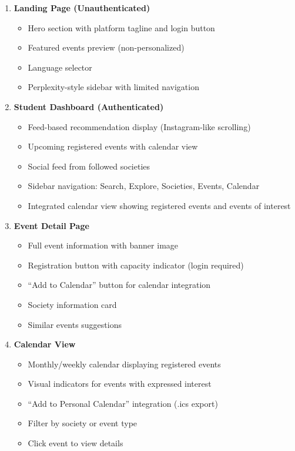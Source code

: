 \documentclass[12pt,a4paper]{article}
\begin{document}
\begin{enumerate}
    \item \textbf{Landing Page (Unauthenticated)}
    \begin{itemize}
        \item Hero section with platform tagline and login button
        \item Featured events preview (non-personalized)
        \item Language selector
        \item Perplexity-style sidebar with limited navigation
    \end{itemize}

    \item \textbf{Student Dashboard (Authenticated)}
    \begin{itemize}
        \item Feed-based recommendation display (Instagram-like scrolling)
        \item Upcoming registered events with calendar view
        \item Social feed from followed societies
        \item Sidebar navigation: Search, Explore, Societies, Events, Calendar
        \item Integrated calendar view showing registered events and events of interest
    \end{itemize}

    \item \textbf{Event Detail Page}
    \begin{itemize}
        \item Full event information with banner image
        \item Registration button with capacity indicator (login required)
        \item ``Add to Calendar'' button for calendar integration
        \item Society information card
        \item Similar events suggestions
    \end{itemize}

    \item \textbf{Calendar View}
    \begin{itemize}
        \item Monthly/weekly calendar displaying registered events
        \item Visual indicators for events with expressed interest
        \item ``Add to Personal Calendar'' integration (.ics export)
        \item Filter by society or event type
        \item Click event to view details
    \end{itemize}


\end{enumerate}
\end{document}
